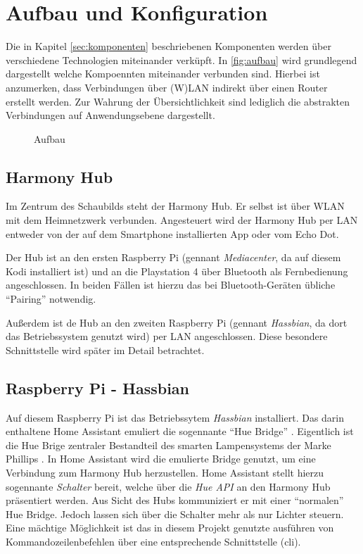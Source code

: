 \section{Aufbau und Konfiguration}\label{sec:aufbau}
Die in Kapitel \ref{sec:komponenten} \textit{} beschriebenen Komponenten werden über verschiedene Technologien miteinander verküpft.
In \autoref{fig:aufbau} wird grundlegend dargestellt welche Kompoennten miteinander verbunden sind.
Hierbei ist anzumerken, dass Verbindungen über (W)LAN indirekt über einen Router erstellt werden.
Zur Wahrung der Übersichtlichkeit sind lediglich die abstrakten Verbindungen auf Anwendungsebene dargestellt.

\begin{figure}[ht!]
    \centering
    \resizebox{\textwidth}{!}{
        
    }
    \caption{Aufbau}
    \label{fig:aufbau}
\end{figure}

\subsection{Harmony Hub}\label{sec:aufbau-hub}
Im Zentrum des Schaubilds steht der Harmony Hub.
Er selbst ist über WLAN mit dem Heimnetzwerk verbunden.
Angesteuert wird der Harmony Hub per LAN entweder von der auf dem Smartphone installierten App oder vom Echo Dot.

Der Hub ist an den ersten Raspberry Pi (gennant \textit{Mediacenter}, da auf diesem Kodi installiert ist)
und an die Playstation 4 über Bluetooth als Fernbedienung angeschlossen.
In beiden Fällen ist hierzu das bei Bluetooth-Geräten übliche \enquote{Pairing} notwendig.

Außerdem ist de Hub an den zweiten Raspberry Pi (gennant \textit{Hassbian}, da dort das Betriebssystem genutzt wird) per LAN angeschlossen.
Diese besondere Schnittstelle wird später im Detail betrachtet.

\subsection{Raspberry Pi - Hassbian}\label{sec:aufbau-hassbian}
Auf diesem Raspberry Pi ist das Betriebssytem \textit{Hassbian} installiert.
Das darin enthaltene Home Assistant emuliert die sogennante \enquote{Hue Bridge} \cite{Emulated83:online}.
Eigentlich ist die Hue Brige zentraler Bestandteil des smarten Lampensystems der Marke Phillips \cite{HueBridg65:online}.
In Home Assistant wird die emulierte Bridge genutzt, um eine Verbindung zum Harmony Hub herzustellen.
Home Assistant stellt hierzu sogennante \textit{Schalter} bereit, welche über die \textit{Hue API} an den Harmony Hub präsentiert werden.
Aus Sicht des Hubs kommuniziert er mit einer \enquote{normalen} Hue Bridge.
Jedoch lassen sich über die Schalter mehr als nur Lichter steuern.
Eine mächtige Möglichkeit ist das in diesem Projekt genutzte ausführen von Kommandozeilenbefehlen über eine entsprechende Schnittstelle (\ac{cli}).

